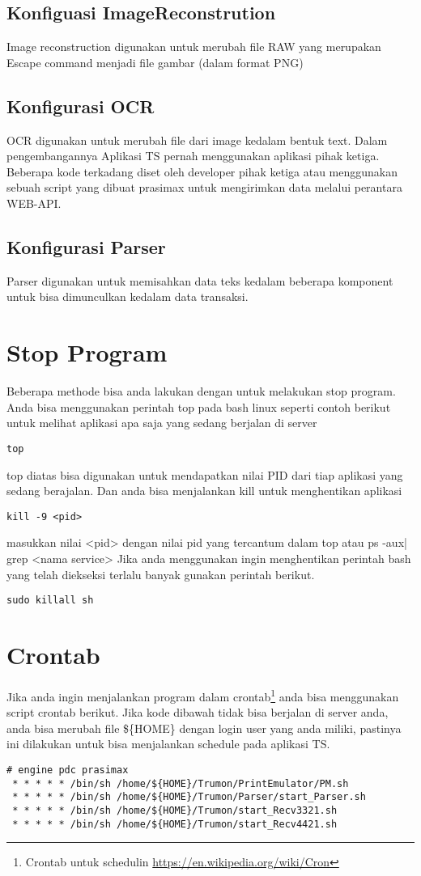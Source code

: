 \documentclass[11pt]{article}
\begin{document}
\subsection{Konfiguasi ImageReconstrution}
\label{sec:org0b86f64}
Image reconstruction digunakan untuk merubah file RAW yang merupakan Escape command menjadi 
file gambar (dalam format PNG)
\subsection{Konfigurasi OCR}
\label{sec:org90e13ff}
OCR  digunakan untuk merubah file dari image kedalam bentuk text. Dalam pengembangannya 
Aplikasi TS pernah menggunakan aplikasi pihak ketiga. Beberapa kode terkadang diset oleh 
developer pihak ketiga atau menggunakan sebuah script yang dibuat prasimax untuk mengirimkan
data melalui perantara WEB-API. 
\subsection{Konfigurasi Parser}
\label{sec:orga218eb7}
Parser digunakan untuk memisahkan data teks kedalam beberapa komponent untuk bisa dimunculkan 
kedalam data transaksi.
\section{Stop Program}
\label{sec:orgcbbabb2}
Beberapa methode bisa anda lakukan dengan untuk melakukan stop program. Anda bisa menggunakan
perintah top pada bash linux seperti contoh berikut untuk melihat aplikasi apa saja yang 
sedang berjalan di server
\begin{verbatim}
top
\end{verbatim}
top diatas bisa digunakan untuk mendapatkan nilai PID dari tiap aplikasi yang sedang berajalan.
Dan anda bisa menjalankan kill untuk menghentikan aplikasi 
\begin{verbatim}
kill -9 <pid>
\end{verbatim}
masukkan nilai <pid> dengan nilai pid yang tercantum dalam top atau ps -aux| grep <nama service>
Jika anda menggunakan ingin menghentikan perintah bash yang telah diekseksi terlalu banyak gunakan 
perintah berikut.

\begin{verbatim}
sudo killall sh
\end{verbatim}

\section{Crontab}
\label{sec:org1dd5029}
Jika anda ingin menjalankan program dalam crontab\footnote{Crontab untuk schedulin  \url{https://en.wikipedia.org/wiki/Cron}} anda bisa menggunakan script crontab berikut. 
Jika kode dibawah tidak bisa berjalan di server anda, anda bisa merubah file \$\{HOME\}
dengan login user yang anda miliki, pastinya ini dilakukan untuk bisa menjalankan schedule
pada aplikasi TS.
\begin{verbatim}
# engine pdc prasimax
 * * * * * /bin/sh /home/${HOME}/Trumon/PrintEmulator/PM.sh
 * * * * * /bin/sh /home/${HOME}/Trumon/Parser/start_Parser.sh
 * * * * * /bin/sh /home/${HOME}/Trumon/start_Recv3321.sh
 * * * * * /bin/sh /home/${HOME}/Trumon/start_Recv4421.sh
\end{verbatim}
\end{document}
